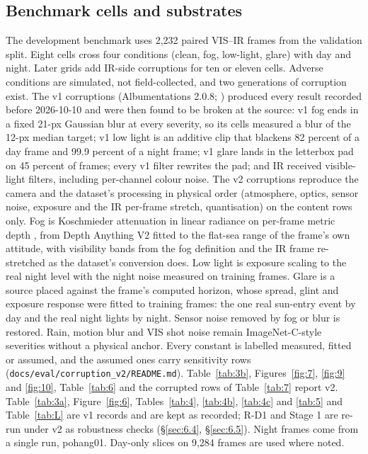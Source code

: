 \documentclass[10pt]{article}
\begin{document}
\subsection{Benchmark cells and substrates}\label{sec:5.1}
The development benchmark uses 2,232 paired VIS--IR frames from the validation split. Eight cells cross four conditions (clean, fog, low-light, glare) with day and night. Later grids add IR-side corruptions for ten or eleven cells. Adverse conditions are simulated, not field-collected, and two generations of corruption exist. The v1 corruptions (Albumentations 2.0.8; \citealp{buslaev2020albumentations}) produced every result recorded before 2026-10-10 and were then found to be broken at the source: v1 fog ends in a fixed 21-px Gaussian blur at every severity, so its cells measured a blur of the 12-px median target; v1 low light is an additive clip that blackens 82 percent of a day frame and 99.9 percent of a night frame; v1 glare lands in the letterbox pad on 45 percent of frames; every v1 filter rewrites the pad; and IR received visible-light filters, including per-channel colour noise. The v2 corruptions reproduce the camera and the dataset's processing in physical order (atmosphere, optics, sensor noise, exposure and the IR per-frame stretch, quantisation) on the content rows only. Fog is Koschmieder attenuation in linear radiance on per-frame metric depth \citep{sakaridis2018semantic}, from Depth Anything V2 \citep{yang2024depth} fitted to the flat-sea range of the frame's own attitude, with visibility bands from the fog definition and the IR frame re-stretched as the dataset's conversion does. Low light is exposure scaling to the real night level with the night noise measured on training frames. Glare is a source placed against the frame's computed horizon, whose spread, glint and exposure response were fitted to training frames: the one real sun-entry event by day and the real night lights by night. Sensor noise removed by fog or blur is restored. Rain, motion blur and VIS shot noise remain ImageNet-C-style severities \citep{hendrycks2019benchmarking} without a physical anchor. Every constant is labelled measured, fitted or assumed, and the assumed ones carry sensitivity rows (\texttt{docs/\allowbreak{}eval/\allowbreak{}corruption\_\allowbreak{}v2/\allowbreak{}README.md}). Table~\ref{tab:3b}, Figures~\ref{fig:7}, \ref{fig:9} and \ref{fig:10}, Table~\ref{tab:6} and the corrupted rows of Table~\ref{tab:7} report v2. Table~\ref{tab:3a}, Figure~\ref{fig:6}, Tables~\ref{tab:4}, \ref{tab:4b}, \ref{tab:4c} and \ref{tab:5} and Table~\ref{tab:L} are v1 records and are kept as recorded; R-D1 and Stage 1 are re-run under v2 as robustness checks (\S\ref{sec:6.4}, \S\ref{sec:6.5}). Night frames come from a single run, pohang01. Day-only slices on 9,284 frames are used where noted.
\end{document}
